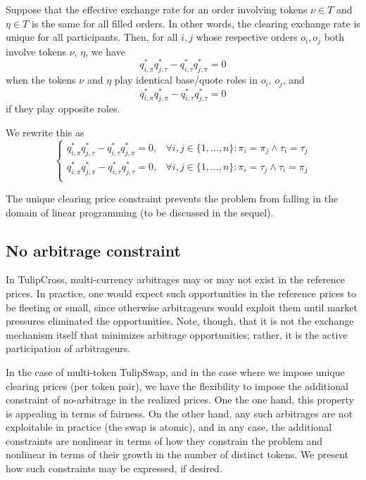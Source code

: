 \documentclass[11pt, reqno]{amsart}
\theoremstyle{definition}
\theoremstyle{remark}
\begin{document}
Suppose that the effective exchange rate for an order involving tokens
$\nu \in T$ and $\eta \in T$ is the same for all filled orders. In other words,
the clearing exchange rate is unique for all participants.
Then, for all $i, j$ whose respective orders $o_i, o_j$ both involve tokens
$\nu$, $\eta$, we have
\[
    q_{i, \pi}^* q_{j, \tau}^* - q_{i, \tau}^* q_{j, \pi}^* = 0
\]
when the tokens $\nu$ and $\eta$ play identical base/quote roles in $o_i$,
$o_j$, and
\[
    q_{i, \pi}^* q_{j, \pi}^* - q_{i, \tau}^* q_{j, \tau}^* = 0
\]
if they play opposite roles.

We rewrite this as
\begin{equation}
    \begin{cases}
        q_{i, \pi}^* q_{j, \tau}^* - q_{i, \tau}^* q_{j, \pi}^* = 0, & \forall i, j \in \{1, \ldots, n\}: \pi_i = \pi_j \land \tau_i = \tau_j \\
        q_{i, \pi}^* q_{j, \pi}^* - q_{i, \tau}^* q_{j, \tau}^* = 0, & \forall i, j \in \{1, \ldots, n\}: \pi_i = \tau_j \land \tau_i = \pi_j \\
    \end{cases}
\label{unique_price_constraint}
\end{equation}

The unique clearing price constraint prevents the problem from falling in the
domain of linear programming (to be discussed in the sequel).

\subsection{No arbitrage constraint}
In TulipCross, multi-currency arbitrages may or may not exist in the reference
prices. In practice, one would expect such opportunities in the reference
prices to be fleeting or small, since otherwise arbitrageurs would exploit
them until market pressures eliminated the opportunities. Note, though, that
it is not the exchange mechanism itself that minimizes arbitrage opportunities;
rather, it is the active participation of arbitrageurs.

In the case of multi-token TulipSwap, and in the case where we impose unique
clearing prices (per token pair), we have the flexibility to impose the
additional constraint of no-arbitrage in the realized prices. One the one hand,
this property is appealing in terms of fairness. On the other hand, any such
arbitrages are not exploitable in practice (the swap is atomic), and in any
case, the additional constraints are nonlinear in terms of how they constrain
the problem and nonlinear in terms of their growth in the number of distinct
tokens. We present how such constraints may be expressed, if desired.
\end{document}
